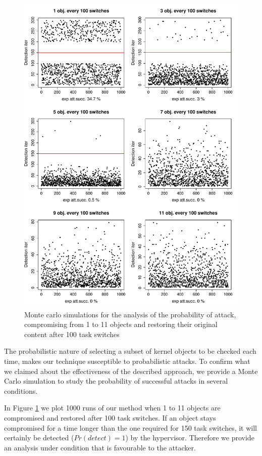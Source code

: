 \begin{figure}[!htbp]
\begin{center}
\includegraphics[width=130mm]{images/hr_sim_1000}
\caption{{Monte carlo simulations for the analysis of the probability of attack, compromising from 1 to 11 objects and restoring their original content after 100 task switches}}
\label{monteanalysis}
\end{center}
\end{figure}

The probabilistic nature of selecting a subset of kernel objects to be checked each time, makes our technique susceptible to probabilistic attacks. 
To confirm what we claimed about the effectiveness of the described approach, we provide a Monte Carlo simulation to study the probability of successful attacks in several conditions. 

In Figure \ref{monteanalysis} we plot 1000 runs of our method when 1 to 11 objects are compromised and restored after 100 task switches. If an object stays compromised for a time longer than the one required for 150 task switches, it will certainly be detected ($Pr(detect)=1$) by the hypervisor. Therefore we provide an analysis under condition that is favourable to the attacker.  

